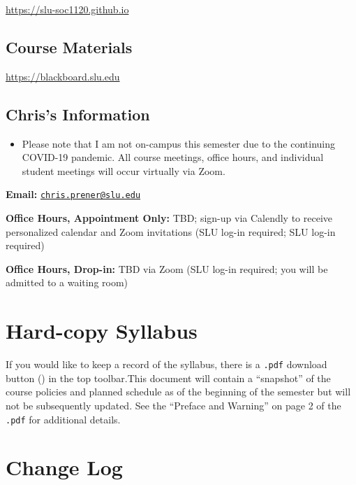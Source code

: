 \documentclass[
]{book}
\newenvironment{rmdblock}[1]
  {\begin{shaded*}
  \begin{itemize}
  \renewcommand{\labelitemi}{
    \raisebox{-.7\height}[0pt][0pt]{
      {\setkeys{Gin}{width=3em,keepaspectratio}\texttt{[image: images/\#1]}}
    }
  }
  \item
  }
  {
  \end{itemize}
  \end{shaded*}
  }
\newenvironment{rmdwarning}
  {\begin{rmdblock}{warning}}
  {\end{rmdblock}}
\begin{document}
\url{https://slu-soc1120.github.io}

\hypertarget{course-materials}{%
\subsection*{Course Materials}\label{course-materials}}

\url{https://blackboard.slu.edu}

\hypertarget{chriss-information}{%
\subsection*{Chris's Information}\label{chriss-information}}

\begin{rmdwarning}
Please note that I am not on-campus this semester due to the continuing
COVID-19 pandemic. All course meetings, office hours, and individual
student meetings will occur virtually via Zoom.
\end{rmdwarning}

\textbf{Email:} \href{mailto:chris.prener@slu.edu}{\nolinkurl{chris.prener@slu.edu}}

\textbf{Office Hours, Appointment Only:} TBD; sign-up via Calendly to receive personalized calendar and Zoom invitations (SLU log-in required; SLU log-in required)

\textbf{Office Hours, Drop-in:} TBD via Zoom (SLU log-in required; you will be admitted to a waiting room)

\hypertarget{hard-copy-syllabus}{%
\section*{Hard-copy Syllabus}\label{hard-copy-syllabus}}

If you would like to keep a record of the syllabus, there is a \texttt{.pdf} download button () in the top toolbar.This document will contain a ``snapshot'' of the course policies and planned schedule as of the beginning of the semester but will not be subsequently updated. See the ``Preface and Warning'' on page 2 of the \texttt{.pdf} for additional details.

\hypertarget{change-log}{%
\section*{Change Log}\label{change-log}}
\end{document}
